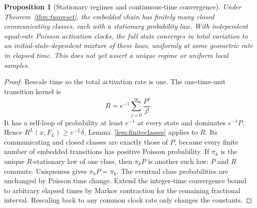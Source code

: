 \documentclass[11pt]{article}
\newtheorem{proposition}[theorem]{Proposition}
\begin{document}
\begin{proposition}[Stationary regimes and continuous-time convergence]
\label{prop:tworegimes}
Under Theorem~\ref{thm:tworeset}, the embedded chain has
finitely many closed communicating classes, each with a
stationary probability law. With independent equal-rate
Poisson activation clocks, the full state converges in
total variation to an initial-state-dependent mixture of
these laws, uniformly at some geometric rate in elapsed time.
This does not yet assert a unique regime or uniform local samples.
\end{proposition}
\begin{proof}
Rescale time so the total activation rate is one.
The one-time-unit transition kernel is
\[
 R=e^{-1}\sum_{j=0}^\infty\frac{P^j}{j!}.
\]
It has a self-loop of probability at least $e^{-1}$ at every
state and dominates $e^{-1}P$. Hence
$R^L(x,F_L)\ge e^{-L}\delta$.
Lemma~\ref{lem:finiteclasses} applies to $R$.
Its communicating and closed classes are exactly those of
$P$, because every finite number of embedded transitions
has positive Poisson probability.
If $\pi_k$ is the unique $R$-stationary law of one class,
then $\pi_k P$ is another such law: $P$ and $R$ commute.
Uniqueness gives $\pi_k P=\pi_k$.
The eventual class probabilities are unchanged by Poisson
time change. Extend the integer-time convergence bound to
arbitrary elapsed times by Markov contraction for the remaining
fractional interval. Rescaling back to any common clock rate
only changes the constants.
\end{proof}
\end{document}
